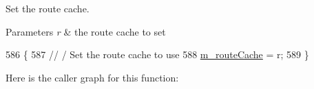 Set the route cache. 


\begin{DoxyParams}{Parameters}
{\em r} & the route cache to set \\
\hline
\end{DoxyParams}

\begin{DoxyCode}
586 \{
587   \textcolor{comment}{// / Set the route cache to use}
588   \hyperlink{classns3_1_1dsr_1_1DsrRouting_ac409bdb961b9fff0fb63ebd026be99ad}{m\_routeCache} = r;
589 \}
\end{DoxyCode}


Here is the caller graph for this function\+:



